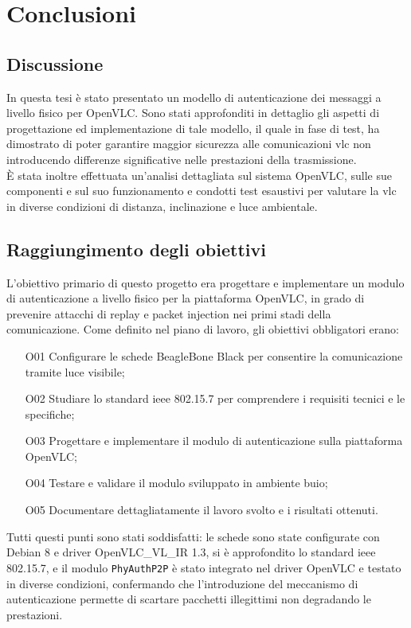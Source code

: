 \chapter{Conclusioni}
\label{cap:conclusioni}

\section{Discussione}
In questa tesi è stato presentato un modello di autenticazione dei messaggi a livello fisico per OpenVLC. Sono stati approfonditi in dettaglio gli aspetti di progettazione ed implementazione di tale modello, il quale in fase di test, ha dimostrato di poter garantire maggior sicurezza alle comunicazioni \gls{vlc} non introducendo differenze significative nelle prestazioni della trasmissione.\\
È stata inoltre effettuata un'analisi dettagliata sul sistema OpenVLC, sulle sue componenti e sul suo funzionamento e condotti test esaustivi per valutare la \gls{vlc} in diverse condizioni di distanza, inclinazione e luce ambientale.

\section{Raggiungimento degli obiettivi}
L'obiettivo primario di questo progetto era progettare e implementare un modulo di autenticazione a livello fisico per la piattaforma OpenVLC, in grado di prevenire attacchi di replay e packet injection nei primi stadi della comunicazione. Come definito nel piano di lavoro, gli obiettivi obbligatori erano:
\begin{itemize}
  \item[O01] Configurare le schede BeagleBone Black per consentire la comunicazione tramite luce visibile;
  \item[O02] Studiare lo standard \gls{ieee} 802.15.7 per comprendere i requisiti tecnici e le specifiche;
  \item[O03] Progettare e implementare il modulo di autenticazione sulla piattaforma OpenVLC;
  \item[O04] Testare e validare il modulo sviluppato in ambiente buio;
  \item[O05] Documentare dettagliatamente il lavoro svolto e i risultati ottenuti.
\end{itemize}
Tutti questi punti sono stati soddisfatti: le schede sono state configurate con Debian 8 e driver OpenVLC\_VL\_IR 1.3, si è approfondito lo standard \gls{ieee} 802.15.7, e il modulo \texttt{PhyAuthP2P} è stato integrato nel driver OpenVLC e testato in diverse condizioni, confermando che l'introduzione del meccanismo di autenticazione permette di scartare pacchetti illegittimi non degradando le prestazioni.

